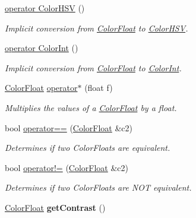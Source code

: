 \begin{DoxyCompactItemize}
\hyperlink{structtsgl_1_1_color_float_a4d74b061239eed7eb351422c18e33a37}{operator Color\+H\+SV} ()
\begin{DoxyCompactList}\small\item\em Implicit conversion from \hyperlink{structtsgl_1_1_color_float}{Color\+Float} to \hyperlink{structtsgl_1_1_color_h_s_v}{Color\+H\+SV}. \end{DoxyCompactList}\item 
\hyperlink{structtsgl_1_1_color_float_a4ef5398fd1ee469dd9b1b43c9ce5c00d}{operator Color\+Int} ()
\begin{DoxyCompactList}\small\item\em Implicit conversion from \hyperlink{structtsgl_1_1_color_float}{Color\+Float} to \hyperlink{structtsgl_1_1_color_int}{Color\+Int}. \end{DoxyCompactList}\item 
\hyperlink{structtsgl_1_1_color_float}{Color\+Float} \hyperlink{structtsgl_1_1_color_float_a09d7cc47ac3d0e23ef7339ccf33111a5}{operator$\ast$} (float f)
\begin{DoxyCompactList}\small\item\em Multiplies the values of a \hyperlink{structtsgl_1_1_color_float}{Color\+Float} by a float. \end{DoxyCompactList}\item 
bool \hyperlink{structtsgl_1_1_color_float_ac29ecf4a36624050af433d691e65651c}{operator==} (\hyperlink{structtsgl_1_1_color_float}{Color\+Float} \&c2)
\begin{DoxyCompactList}\small\item\em Determines if two Color\+Floats are equivalent. \end{DoxyCompactList}\item 
bool \hyperlink{structtsgl_1_1_color_float_afd92fcf8743d931cfbcf405209c923fc}{operator!=} (\hyperlink{structtsgl_1_1_color_float}{Color\+Float} \&c2)
\begin{DoxyCompactList}\small\item\em Determines if two Color\+Floats are {\itshape N\+OT} equivalent. \end{DoxyCompactList}\item 
\mbox{\label{structtsgl_1_1_color_float_ab4ba72dcb514b69290483569abec927e}} 
\hyperlink{structtsgl_1_1_color_float}{Color\+Float} {\bfseries get\+Contrast} ()
\end{DoxyCompactItemize}

